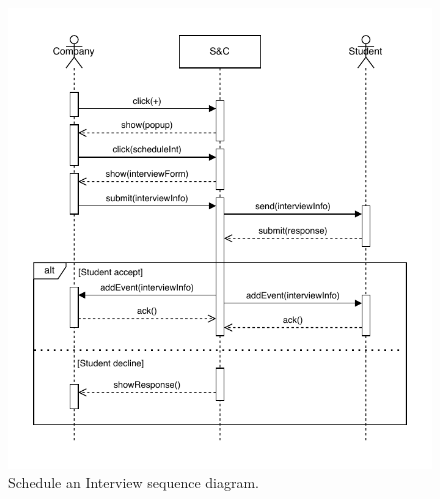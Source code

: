 \begin{figure}[H]
    \begin{center}
        \includegraphics[width=\linewidth]{Images/SequenceDiagram/ScheduleInterviewSD.pdf}
        \caption{Schedule an Interview sequence diagram.}
        \label{fig:schedule_interview_seqdiag}%
    \end{center}
\end{figure}


